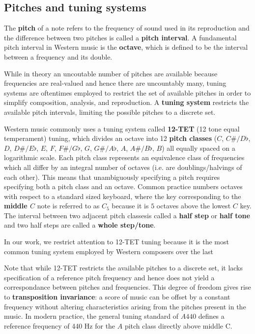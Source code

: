 \subsection{Pitches and tuning systems}

The \textbf{pitch} of a note refers to the frequency of sound used in its
reproduction and the difference between two pitches is called a \textbf{pitch
interval}. A fundamental pitch interval in Western music is the
\textbf{octave}, which is defined to be the interval between a frequency and
its double.

While in theory an uncoutable number of pitches are available because
frequencies are real-valued and hence there are uncountably many, tuning
systems are oftentimes employed to restrict the set of available pitches in
order to simplify composition, analysis, and reproduction. A \textbf{tuning
system} restricts the available pitch intervals, limiting the possible pitches
to a discrete set.

Western music commonly uses a tuning system called \textbf{12-TET} (12 tone
equal temperament) tuning, which divides an octave into 12 \textbf{pitch
classes} ($C$, $C\#/D\flat$, $D$, $D\#/E\flat$, $E$, $F$, $F\#/G\flat$, $G$,
$G\#/A\flat$, $A$, $A\#/B\flat$, $B$) all equally spaced on a logarithmic
scale. Each pitch class represents an equivalence class of frequencies which
all differ by an integral number of octaves (i.e. are doublings/halvings of
each other). This means that unambiguously specifying a pitch requires
specifying both a pitch class and an octave. Common practice numbers octaves
with respect to a standard sized keyboard, where the key corresponding to the
\textbf{middle $C$} note is referred to as $C_5$ because it is $5$ octaves
above the lowest $C$ key. The interval between two adjacent pitch classesis
called a \textbf{half step} or \textbf{half tone} and two half steps are called
a \textbf{whole step/tone}.

In our work, we restrict attention to 12-TET tuning because it is the most
common tuning system employed by Western composers over the last

Note that while 12-TET restricts the available pitches to a discrete set, it
lacks specification of a reference pitch frequency and hence does not yield a
correspondance between pitches and frequencies. This degree of freedom gives
rise to \textbf{transposition invariance}: a score of music can be offset by a
constant frequency without altering characteristics arising from the pitches
present in the music. In modern practice, the general tuning standard of $A440$
defines a reference frequency of 440 Hz for the $A$ pitch class directly above
middle C.

